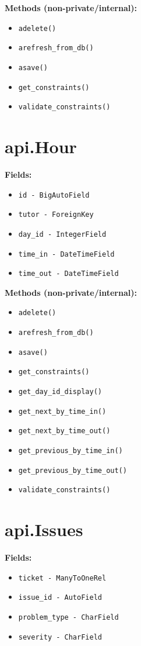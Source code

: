 \documentclass[oneside,openany,obeyspaces]{book}
\begin{document}
\begin{flushleft}
    \textbf{Methods (non-private/internal):}
    \begin{itemize}
        \item \texttt{adelete()}
        \item \texttt{arefresh\_from\_db()}
        \item \texttt{asave()}
        \item \texttt{get\_constraints()}
        \item \texttt{validate\_constraints()}
    \end{itemize}

    \section*{api.Hour}
    \textbf{Fields:}
    \begin{itemize}
        \item \texttt{id - BigAutoField}
        \item \texttt{tutor - ForeignKey}
        \item \texttt{day\_id - IntegerField}
        \item \texttt{time\_in - DateTimeField}
        \item \texttt{time\_out - DateTimeField}
    \end{itemize}

    \textbf{Methods (non-private/internal):}
    \begin{itemize}
        \item \texttt{adelete()}
        \item \texttt{arefresh\_from\_db()}
        \item \texttt{asave()}
        \item \texttt{get\_constraints()}
        \item \texttt{get\_day\_id\_display()}
        \item \texttt{get\_next\_by\_time\_in()}
        \item \texttt{get\_next\_by\_time\_out()}
        \item \texttt{get\_previous\_by\_time\_in()}
        \item \texttt{get\_previous\_by\_time\_out()}
        \item \texttt{validate\_constraints()}
    \end{itemize}

    \section*{api.Issues}
    \textbf{Fields:}
    \begin{itemize}
        \item \texttt{ticket - ManyToOneRel}
        \item \texttt{issue\_id - AutoField}
        \item \texttt{problem\_type - CharField}
        \item \texttt{severity - CharField}
    \end{itemize}


\end{flushleft}
\end{document}
